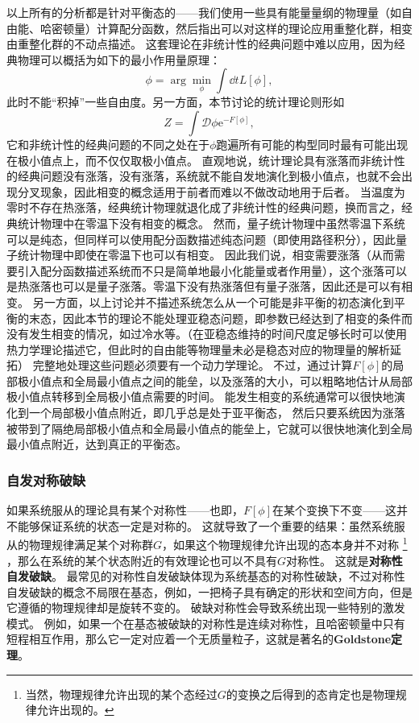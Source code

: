 \documentclass[hyperref, UTF8, a4paper]{ctexart}
\newcommand*{\ee}{\mathrm{e}}
\newcommand*{\fd}[1]{\mathcal{D}{#1}}
\begin{document}
以上所有的分析都是针对平衡态的——我们使用一些具有能量量纲的物理量（如自由能、哈密顿量）计算配分函数，然后指出可以对这样的理论应用重整化群，相变由重整化群的不动点描述。
这套理论在非统计性的经典问题中难以应用，因为经典物理可以概括为如下的最小作用量原理：
\[
    \phi = \arg\min_{\phi} \int \dd{t} L[\phi],
\]
此时不能“积掉”一些自由度。另一方面，本节讨论的统计理论则形如
\[
   Z = \int \fd{\phi} \ee^{- F[\phi]},
\]
它和非统计性的经典问题的不同之处在于$\phi$跑遍所有可能的构型同时最有可能出现在极小值点上，而不仅仅取极小值点。
直观地说，统计理论具有涨落而非统计性的经典问题没有涨落，没有涨落，系统就不能自发地演化到极小值点，也就不会出现分叉现象，因此相变的概念适用于前者而难以不做改动地用于后者。
当温度为零时不存在热涨落，经典统计物理就退化成了非统计性的经典问题，换而言之，经典统计物理中在零温下没有相变的概念。
然而，量子统计物理中虽然零温下系统可以是纯态，但同样可以使用配分函数描述纯态问题（即使用路径积分），因此量子统计物理中即使在零温下也可以有相变。
因此我们说，相变需要涨落（从而需要引入配分函数描述系统而不只是简单地最小化能量或者作用量），这个涨落可以是热涨落也可以是量子涨落。零温下没有热涨落但有量子涨落，因此还是可以有相变。
另一方面，以上讨论并不描述系统怎么从一个可能是非平衡的初态演化到平衡的末态，因此本节的理论不能处理亚稳态问题，即参数已经达到了相变的条件而没有发生相变的情况，如过冷水等。（在亚稳态维持的时间尺度足够长时可以使用热力学理论描述它，但此时的自由能等物理量未必是稳态对应的物理量的解析延拓）
完整地处理这些问题必须要有一个动力学理论。
不过，通过计算$F[\phi]$的局部极小值点和全局最小值点之间的能垒，以及涨落的大小，可以粗略地估计从局部极小值点转移到全局极小值点需要的时间。
能发生相变的系统通常可以很快地演化到一个局部极小值点附近，即几乎总是处于亚平衡态，%
然后只要系统因为涨落被带到了隔绝局部极小值点和全局最小值点的能垒上，它就可以很快地演化到全局最小值点附近，达到真正的平衡态。

\subsubsection{自发对称破缺}

如果系统服从的理论具有某个对称性——也即，$F[\phi]$在某个变换下不变——这并不能够保证系统的状态一定是对称的。
这就导致了一个重要的结果：虽然系统服从的物理规律满足某个对称群$G$，如果这个物理规律允许出现的态本身并不对称%
\footnote{当然，物理规律允许出现的某个态经过$G$的变换之后得到的态肯定也是物理规律允许出现的。}%
，那么在系统的某个状态附近的有效理论也可以不具有$G$对称性。
这就是\textbf{对称性自发破缺}。
最常见的对称性自发破缺体现为系统基态的对称性破缺，不过对称性自发破缺的概念不局限在基态，例如，一把椅子具有确定的形状和空间方向，但是它遵循的物理规律却是旋转不变的。
破缺对称性会导致系统出现一些特别的激发模式。
例如，如果一个在基态被破缺的对称性是连续对称性，且哈密顿量中只有短程相互作用，那么它一定对应着一个无质量粒子，这就是著名的\textbf{Goldstone定理}。
\end{document}
